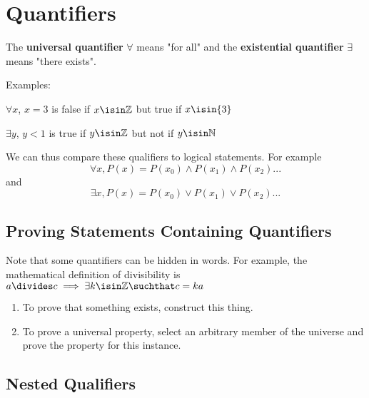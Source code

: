 \documentclass[12pt]{article}
\begin{document}


\section*{Quantifiers}
The {\bf universal quantifier} $\forall$ means "for all" and the {\bf existential quantifier} $\exists$ means "there exists".

Examples:

$\forall x$, $x = 3$ is false if $x \isin \mathbb{Z}$ but true if $x \isin \{ 3 \}$

$\exists y$, $y < 1$ is true if $y \isin \mathbb{Z}$ but not if $y \isin \mathbb{N}$

We can thus compare these qualifiers to logical statements. For example \[ \forall x, P(x) = P(x_0) \land P(x_1) \land P(x_2) ... \] and \[ \exists x, P(x) = P(x_0) \lor P(x_1) \lor P(x_2) ... \]

\subsection*{Proving Statements Containing Quantifiers}
Note that some quantifiers can be hidden in words. For example, the mathematical definition of divisibility is $a \divides c \implies \exists k \isin \mathbb{Z} \suchthat c = ka$
\begin{enumerate}
\item To prove that something exists, construct this thing.
\item To prove a universal property, select an arbitrary member of the universe and prove the property for this instance.
\end{enumerate}

\subsection*{Nested Qualifiers}

\end{document}
